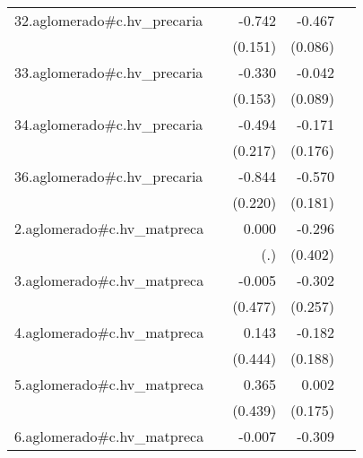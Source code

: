 {\begin{longtable}{l*{4}{D{.}{.}{-1}}}
\addlinespace
32.aglomerado#c.hv\_precaria&                     &      -0.742\sym{***}&      -0.467\sym{***}&                     \\
            &                     &     (0.151)         &     (0.086)         &                     \\
\addlinespace
33.aglomerado#c.hv\_precaria&                     &      -0.330\sym{*}  &      -0.042         &                     \\
            &                     &     (0.153)         &     (0.089)         &                     \\
\addlinespace
34.aglomerado#c.hv\_precaria&                     &      -0.494\sym{*}  &      -0.171         &                     \\
            &                     &     (0.217)         &     (0.176)         &                     \\
\addlinespace
36.aglomerado#c.hv\_precaria&                     &      -0.844\sym{***}&      -0.570\sym{**} &                     \\
            &                     &     (0.220)         &     (0.181)         &                     \\
\addlinespace
2.aglomerado#c.hv\_matpreca&                     &       0.000         &      -0.296         &                     \\
            &                     &         (.)         &     (0.402)         &                     \\
\addlinespace
3.aglomerado#c.hv\_matpreca&                     &      -0.005         &      -0.302         &                     \\
            &                     &     (0.477)         &     (0.257)         &                     \\
\addlinespace
4.aglomerado#c.hv\_matpreca&                     &       0.143         &      -0.182         &                     \\
            &                     &     (0.444)         &     (0.188)         &                     \\
\addlinespace
5.aglomerado#c.hv\_matpreca&                     &       0.365         &       0.002         &                     \\
            &                     &     (0.439)         &     (0.175)         &                     \\
\addlinespace
6.aglomerado#c.hv\_matpreca&                     &      -0.007         &      -0.309         &                     \\

\end{longtable}}

